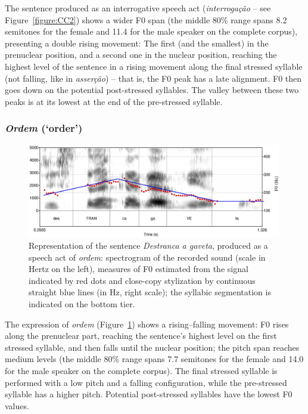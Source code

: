 \documentclass[output=paper]{LSP/langsci}
\begin{document}
The sentence produced as an interrogative speech act (\textit{interrogação} -- see Figure~\ref{figure:CC2}) shows a wider F0 span (the middle 80\% range spans 8.2 semitones for the female and 11.4 for the male speaker on the complete corpus), presenting a double rising movement: The first (and the smallest) in the prenuclear position, and a second one in the nuclear position, reaching the highest level of the sentence in a rising movement along the final stressed syllable (not falling, like in \textit{asserção}) -- that is, the F0 peak has a late alignment. 
F0 then goes down on the potential post-stressed syllables. 
The valley between these two peaks is at its lowest at the end of the pre-stressed syllable.


\subsubsection{\textit{Ordem} (`order')}


\begin{figure}

\includegraphics[width=0.99\textwidth]{figures/MOR5.eps}
\caption{Representation of the sentence \textit{Destranca a gaveta}, produced as a speech act of \textit{ordem}: spectrogram of the recorded sound (scale in Hertz on the left), measures of F0 estimated from the signal indicated by red dots and close-copy stylization by continuous straight blue lines (in Hz, right scale); the syllabic segmentation is indicated on the bottom tier.}
\label{figure:CC3}
\end{figure}

The expression of \textit{ordem} (Figure~\ref{figure:CC3}) shows a rising–falling movement: F0 rises along the prenuclear part, reaching the sentence's highest level on the first stressed syllable, and then falls until the nuclear position; the pitch span reaches medium levels (the middle 80\% range spans 7.7 semitones for the female and 14.0 for the male speaker on the complete corpus). 
The final stressed syllable is performed with a low pitch and a falling configuration, while the pre-stressed syllable has a higher pitch. 
Potential post-stressed syllables have the lowest F0 values.
\end{document}
